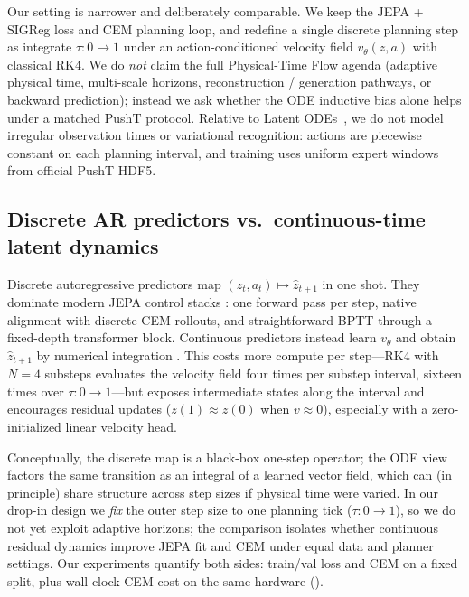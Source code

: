 Our \method{} setting is narrower and deliberately comparable.
We keep the JEPA + SIGReg loss and CEM planning loop, and redefine a
single discrete planning step as integrate $\tau{:}0\to 1$ under an
action-conditioned velocity field $v_\theta(z,a)$ with classical RK4.
We do \emph{not} claim the full Physical-Time Flow agenda (adaptive
physical time, multi-scale horizons, reconstruction /
generation pathways, or backward prediction); instead we ask whether
the ODE inductive bias alone helps under a matched PushT protocol.
Relative to Latent ODEs~\cite{rubanova2019latentode}, we do not model
irregular observation times or variational recognition: actions are
piecewise constant on each planning interval, and training uses
uniform expert windows from official PushT HDF5.

\subsection{Discrete AR predictors vs.\ continuous-time latent dynamics}
\label{sec:rel-disc-cont}

Discrete autoregressive predictors map $(z_t,a_t)\mapsto\hat z_{t+1}$
in one shot.
They dominate modern JEPA control stacks
\cite{maes2026lewm,assran2025vjepa2}: one forward pass per step,
native alignment with discrete CEM rollouts, and straightforward
BPTT through a fixed-depth transformer block.
Continuous predictors instead learn $v_\theta$ and obtain
$\hat z_{t+1}$ by numerical integration
\cite{chen2018neuralode,liu2026odeworld}.
This costs more compute per step---RK4 with $N{=}4$ substeps evaluates
the velocity field four times per substep interval, sixteen times over
$\tau{:}0\to1$---but exposes intermediate states along the interval
and encourages residual updates ($z(1)\approx z(0)$ when $v\approx 0$),
especially with a zero-initialized linear velocity head.

Conceptually, the discrete map is a black-box one-step operator;
the ODE view factors the same transition as an integral of a learned
vector field, which can (in principle) share structure across step
sizes if physical time were varied.
In our drop-in design we \emph{fix} the outer step size to one
planning tick ($\tau{:}0\to1$), so we do not yet exploit adaptive
horizons; the comparison isolates whether continuous residual
dynamics improve JEPA fit and CEM under equal data and planner
settings.
Our experiments quantify both sides: train/val loss and CEM on a fixed
split, plus wall-clock CEM cost on the same hardware
().

